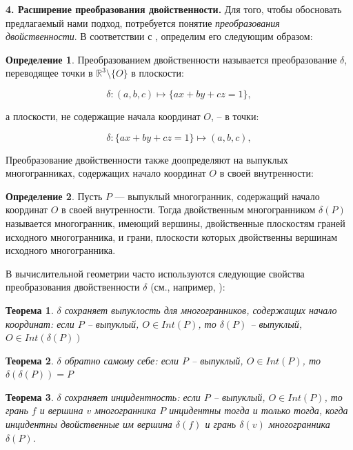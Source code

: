 \documentclass[a4paper, 10pt]{article}
\theoremstyle{definition}
\newtheorem{SmartDefinition}{Определение}
\theoremstyle{plain}
\newtheorem{SmartTheorem}{Теорема}
\theoremstyle{plain}
\begin{document}
\textbf{4. Расширение преобразования двойственности.}
Для того, чтобы обосновать предлагаемый нами подход, потребуется понятие
\textit{преобразования двойственности}. В соответствии с
\cite{PreparataShamos}, определим его следующим образом:

\begin{SmartDefinition}
 Преобразованием двойственности называется преобразование $\delta$, переводящее
 точки в $\mathbb{R}^{3} \setminus \{O\}$ в плоскости:

 \begin{equation}
  \delta: (a, b, c) \mapsto \{a x + b y + c z = 1\},
 \end{equation}

 а плоскости, не содержащие начала координат $O$, -- в точки:

 \begin{equation}
  \delta: \{a x + b y + c z = 1\} \mapsto (a, b, c),
 \end{equation}
\end{SmartDefinition}

Преобразование двойственности также доопределяют на выпуклых многогранниках,
содержащих начало координат $O$ в своей внутренности:

\begin{SmartDefinition}
 Пусть $P$ --- выпуклый многогранник, содержащий начало координат $O$ в своей
 внутренности. Тогда двойственным многогранником $\delta(P)$ называется
 многогранник, имеющий вершины, двойственные плоскостям граней исходного
 многогранника, и грани, плоскости которых двойственны вершинам исходного
 многогранника.
\end{SmartDefinition}

В вычислительной геометрии часто используются следующие свойства преобразования
двойственности $\delta$ (см., например, \cite{Chazelle}):

\begin{SmartTheorem}
\label{theorem:automorhism}
 $\delta$ сохраняет выпуклость для многогранников, содержащих начало координат:
 если $P$ -- выпуклый, $O \in Int(P)$, то $\delta(P)$ -- выпуклый,
 $O \in Int(\delta(P))$
\end{SmartTheorem}

\begin{SmartTheorem}
\label{theorem:self-inverse}
 $\delta$ обратно самому себе: если $P$ -- выпуклый, $O \in Int(P)$, то
 $\delta(\delta(P)) = P$
\end{SmartTheorem}

\begin{SmartTheorem}
\label{theorem:incidence-saving}
 $\delta$ сохраняет инцидентность: если $P$ -- выпуклый, $O \in Int(P)$, то
 грань $f$ и вершина $v$ многогранника $P$ инцидентны тогда и только тогда,
 когда инцидентны двойственные им вершина $\delta(f)$ и грань $\delta(v)$
 многогранника $\delta(P)$.
\end{SmartTheorem}
\end{document}
